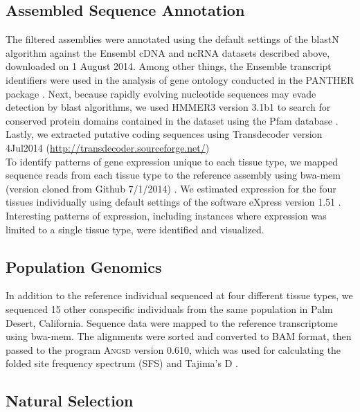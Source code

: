 \documentclass[11pt]{article}
\begin{document}
\subsection*{Assembled Sequence Annotation}



The filtered assemblies were annotated using the default settings of the blastN algorithm \cite{Camacho:2009fc} against the Ensembl cDNA and ncRNA datasets described above, downloaded on 1 August 2014. Among other things, the Ensemble transcript identifiers were used in the analysis of gene ontology conducted in the PANTHER package \cite{Mi:2004iv}. Next, because rapidly evolving nucleotide sequences may evade detection by blast algorithms, we used HMMER3 version 3.1b1 \cite{Wheeler:2013gj} to search for conserved protein domains contained in the dataset using the Pfam database \cite{Punta:2012ko}. Lastly, we extracted putative coding sequences using Transdecoder version 4Jul2014 (\url{http://transdecoder.sourceforge.net/})\\

To identify patterns of gene expression unique to each tissue type, we mapped sequence reads from each tissue type to the reference assembly using bwa-mem (version cloned from Github 7/1/2014)  \cite{Li:2013wn}. We estimated expression for the four tissues individually using default settings of the software eXpress version 1.51 \cite{Roberts:2012dh}. Interesting patterns of expression, including instances where expression was limited to a single tissue type, were identified and visualized. \\ 

\subsection*{Population Genomics}

In addition to the reference individual sequenced at four different tissue types, we sequenced 15 other conspecific individuals from the same population in Palm Desert, California. Sequence data were mapped to the reference transcriptome using bwa-mem. The alignments were sorted and converted to BAM format, then passed to the program \textsc{Angsd} version 0.610, which was used for calculating the folded site frequency spectrum (SFS) and Tajima's D \cite{Korneliussen:2013uz}. \\


\subsection*{Natural Selection}
\end{document}
